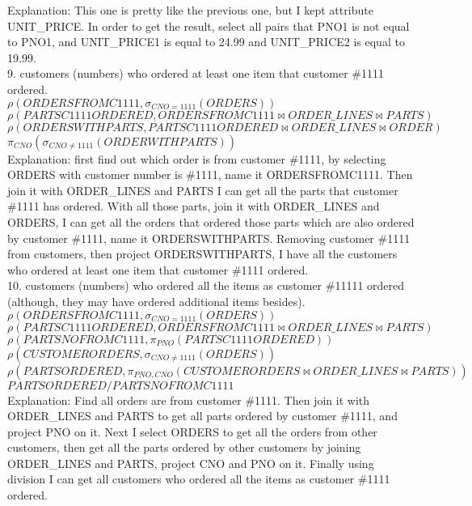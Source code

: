 \documentclass[12pt,a4paper]{amsart}
\begin{document}
Explanation: This one is pretty like the previous one, but I kept attribute UNIT\_PRICE.  In order to get the result, select all pairs that PNO1 is not equal to PNO1, and UNIT\_PRICE1 is equal to 24.99 and UNIT\_PRICE2 is equal to 19.99. \\

9. customers (numbers) who ordered at least one item that customer \#1111 ordered. \\
$\rho (ORDERSFROMC1111, \sigma_{CNO=1111}(ORDERS)) $ \\
$\rho (PARTSC1111ORDERED, ORDERSFROMC1111 \Join ORDER\_LINES \Join PARTS) $ \\
$\rho (ORDERSWITHPARTS, PARTSC1111ORDERED \Join ORDER\_LINES \Join ORDER) $ \\
$\pi_{CNO} (\sigma_{CNO \neq 1111}(ORDERWITHPARTS)) $ \\

Explanation: first find out which order is from customer \#1111, by selecting ORDERS with customer number is \#1111, name it ORDERSFROMC1111. Then join it with ORDER\_LINES and PARTS I can get all the parts that customer \#1111 has ordered. With all those parts, join it with ORDER\_LINES and ORDERS, I can get all the orders that ordered those parts which are also ordered by customer \#1111, name it ORDERSWITHPARTS. Removing customer \#1111 from customers, then project ORDERSWITHPARTS, I have all the customers who ordered at least one item that customer \#1111 ordered. \\

10. customers (numbers) who ordered all the items as customer \#11111 ordered (although, they may have ordered additional items besides). \\
$\rho (ORDERSFROMC1111, \sigma_{CNO=1111}(ORDERS)) $ \\
$\rho (PARTSC1111ORDERED, ORDERSFROMC1111 \Join ORDER\_LINES \Join PARTS) $ \\
$\rho (PARTSNOFROMC1111, \pi_{PNO}(PARTSC1111ORDERED)) $ \\
$\rho (CUSTOMERORDERS, \sigma_{CNO \neq 1111}(ORDERS)) $ \\
$\rho (PARTSORDERED, \pi_{PNO, CNO}(CUSTOMERORDERS \Join ORDER\_LINES \Join PARTS)) $ \\
$PARTSORDERED / PARTSNOFROMC1111$  \\

Explanation: Find all orders are from customer \#1111. Then join it with ORDER\_LINES and PARTS to get all parts ordered by customer \#1111, and project PNO on it. Next I select ORDERS to get all the orders from other customers, then get all the parts ordered by other customers by joining ORDER\_LINES and PARTS, project CNO and PNO on it. Finally using division I can get all customers who ordered all the items as customer \#1111 ordered. \\
\end{document}
